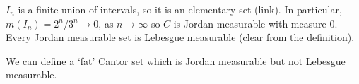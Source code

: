 \documentclass{article}
\newcommand{\1}[1]{\mathbbm{1}_{#1}}
\begin{document}
\begin{remark}
    $I_n$ is a finite union of intervals, so it is an elementary set (link). In particular, $m(I_n) = 2^n / 3^n \to 0$, as $n \to \infty$ so $C$ is Jordan measurable with measure $0$.
    Every Jordan measurable set is Lebesgue measurable (clear from the definition).
\end{remark}

We can define a `fat' Cantor set which is Jordan measurable but not Lebesgue measurable.
\end{document}
